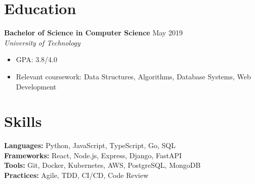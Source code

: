 \documentclass[11pt,a4paper]{article}
\begin{document}
\section*{Education}

\textbf{Bachelor of Science in Computer Science} \hfill May 2019 \\
\textit{University of Technology}
\begin{itemize}[leftmargin=*, nosep]
    \item GPA: 3.8/4.0
    \item Relevant coursework: Data Structures, Algorithms, Database Systems, Web Development
\end{itemize}

\section*{Skills}
\textbf{Languages:} Python, JavaScript, TypeScript, Go, SQL \\
\textbf{Frameworks:} React, Node.js, Express, Django, FastAPI \\
\textbf{Tools:} Git, Docker, Kubernetes, AWS, PostgreSQL, MongoDB \\
\textbf{Practices:} Agile, TDD, CI/CD, Code Review
\end{document}
